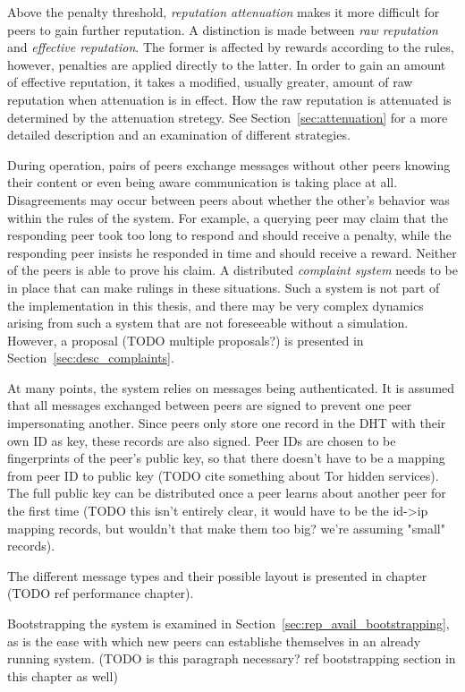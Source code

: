 Above the penalty threshold, \emph{reputation attenuation} makes it more
difficult for peers to gain further reputation. A distinction is made between
\emph{raw reputation} and \emph{effective reputation}. The former is affected by
rewards according to the rules, however, penalties are applied directly to the
latter. In order to gain an amount of effective reputation, it takes a modified,
usually greater, amount of raw reputation when attenuation is in effect. How the
raw reputation is attenuated is determined by the attenuation stretegy. See
Section~\ref{sec:attenuation} for a more detailed description and an examination
of different strategies.

During operation, pairs of peers exchange messages without other peers knowing
their content or even being aware communication is taking place at all.
Disagreements may occur between peers about whether the other's behavior was
within the rules of the system. For example, a querying peer may claim that the
responding peer took too long to respond and should receive a penalty, while the
responding peer insists he responded in time and should receive a reward.
Neither of the peers is able to prove his claim. A distributed \emph{complaint
system} needs to be in place that can make rulings in these situations. Such a
system is not part of the implementation in this thesis, and there may be very
complex dynamics arising from such a system that are not foreseeable without a
simulation. However, a proposal (TODO multiple proposals?) is presented in
Section~\ref{sec:desc_complaints}.

At many points, the system relies on messages being authenticated. It is assumed
that all messages exchanged between peers are signed to prevent one peer
impersonating another. Since peers only store one record in the \ac{DHT} with
their own ID as key, these records are also signed. Peer IDs are chosen to be
fingerprints of the peer's public key, so that there doesn't have to be a
mapping from peer ID to public key (TODO cite something about Tor hidden
services). The full public key can be distributed once a peer learns about
another peer for the first time (TODO this isn't entirely clear, it would have
to be the id->ip mapping records, but wouldn't that make them too big? we're
assuming "small" records).

The different message types and their possible layout is presented in chapter
(TODO ref performance chapter).

Bootstrapping the system is examined in
Section~\ref{sec:rep_avail_bootstrapping}, as is the ease with which new peers
can establishe themselves in an already running system. (TODO is this paragraph
necessary? ref bootstrapping section in this chapter as well)

